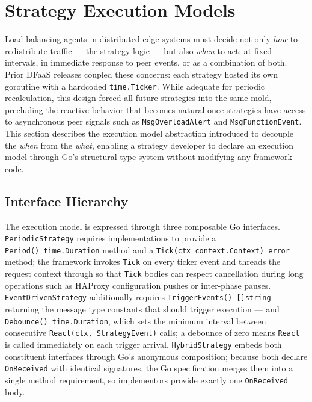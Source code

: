 
\section{Strategy Execution Models}
\label{sec:execution-models}

Load-balancing agents in distributed edge systems must decide not only \emph{how}
to redistribute traffic — the strategy logic — but also \emph{when} to act:
at fixed intervals, in immediate response to peer events, or as a combination of
both.
Prior \ac{DFaaS} releases coupled these concerns: each strategy hosted its own
goroutine with a hardcoded \texttt{time.Ticker}.
While adequate for periodic recalculation, this design forced all future
strategies into the same mold, precluding the reactive behavior that becomes
natural once strategies have access to asynchronous peer signals such as
\texttt{MsgOverloadAlert} and \texttt{MsgFunctionEvent}.
This section describes the execution model abstraction introduced to decouple the
\emph{when} from the \emph{what}, enabling a strategy developer to declare an
execution model through Go's structural type system without modifying any
framework code.

\subsection{Interface Hierarchy}
\label{subsec:interfaces}

The execution model is expressed through three composable Go interfaces.
\texttt{PeriodicStrategy} requires implementations to provide a
\texttt{Period()~time.Duration} method and a
\texttt{Tick(ctx~context.Context)~error} method; the framework invokes
\texttt{Tick} on every ticker event and threads the request context through so
that \texttt{Tick} bodies can respect cancellation during long operations such
as \ac{HAProxy} configuration pushes or inter-phase pauses.
\texttt{EventDrivenStrategy} additionally requires
\texttt{TriggerEvents()~[]string} — returning the message type constants that
should trigger execution — and \texttt{Debounce()~time.Duration}, which sets the
minimum interval between consecutive \texttt{React(ctx,~StrategyEvent)} calls;
a debounce of zero means \texttt{React} is called immediately on each trigger
arrival.
\texttt{HybridStrategy} embeds both constituent interfaces through Go's anonymous
composition; because both declare \texttt{OnReceived} with identical signatures,
the Go specification merges them into a single method requirement, so
implementors provide exactly one \texttt{OnReceived} body.

